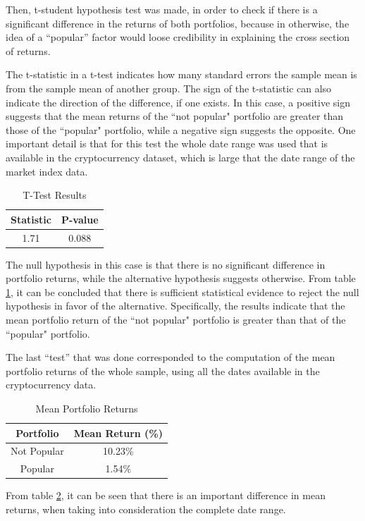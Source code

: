 Then, t-student hypothesis test was made, in order to check if there is a significant difference in the returns of both portfolios, because in otherwise, the idea of a ``popular'' factor would loose credibility in explaining the cross section of returns.

The t-statistic in a t-test indicates how many standard errors the sample mean is from the sample mean of another group. The sign of the t-statistic can also indicate the direction of the difference, if one exists. In this case, a positive sign suggests that the mean returns of the ``not popular" portfolio are greater than those of the ``popular" portfolio, while a negative sign suggests the opposite. One important detail is that for this test the whole date range was used that is available in the cryptocurrency dataset, which is large that the date range of the market index data.
\begin{table}[h!]
	\centering
	\captionsetup{skip=0.5\baselineskip}
	\caption{T-Test Results}
	\begin{tabular}{|c|c|}
		\hline
		\textbf{Statistic} & \textbf{P-value} \\ \hline
		1.71 & 0.088 \\ \hline
	\end{tabular}
	\label{tab:ttest-results}
\end{table}

The null hypothesis in this case is that there is no significant difference in portfolio returns, while the alternative hypothesis suggests otherwise. From table \ref{tab:ttest-results}, it can be concluded that there is sufficient statistical evidence to reject the null hypothesis in favor of the alternative. Specifically, the results indicate that the mean portfolio return of the ``not popular" portfolio is greater than that of the ``popular" portfolio.

The last ``test'' that was done corresponded to the computation of the mean portfolio returns of the whole sample, using all the dates available in the cryptocurrency data.
\begin{table}[h!]
	\centering
	\captionsetup{skip=0.5\baselineskip}
	\caption{Mean Portfolio Returns}
	\begin{tabular}{|c|c|}
		\hline
		\textbf{Portfolio} & \textbf{Mean Return (\%)} \\ \hline
		Not Popular & 10.23\% \\ \hline
		Popular & 1.54\% \\ \hline
	\end{tabular}
	\label{tab:mean-portfolio-returns}
\end{table}
From table \ref{tab:mean-portfolio-returns}, it can be seen that there is an important difference in mean returns, when taking into consideration the complete date range.

